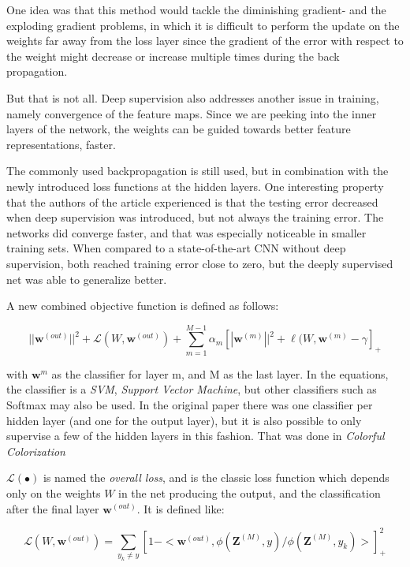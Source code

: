 One idea was that this method would tackle the diminishing gradient- and the exploding gradient problems, in which it is difficult to perform the update on the weights far away from the loss layer since the gradient of the error with respect to the weight might decrease or increase multiple times during the back propagation. 

But that is not all. Deep supervision also addresses another issue in training, namely convergence of the feature maps. Since we are peeking into the inner layers of the network, the weights can be guided towards better feature representations, faster. 

The commonly used backpropagation is still used, but in combination with the newly introduced loss functions at the hidden layers. One interesting property that the authors of the article experienced is that the testing error decreased when deep supervision was introduced, but not always the training error. The networks did converge faster, and that was especially noticeable in smaller training sets. When compared to a state-of-the-art CNN without deep supervision, both reached training error close to zero, but the deeply supervised net was able to generalize better. 

A new combined objective function is defined as follows:

\begin{equation}
||\textbf{w}^{(out)}||^2 + \mathcal{L}(W, \textbf{w}^{(out)}) + \sum\limits_{m = 1}^{M - 1}\alpha_m[|\textbf{w}^{(m)}||^2 + \ell(W, \textbf{w}^{(m)} - \gamma]_+
\end{equation}

with $\textbf{w}^{m}$ as the classifier for layer m, and M as the last layer. In the equations, the classifier is a \emph{SVM}, \emph{Support Vector Machine}, but other classifiers such as Softmax may also be used. In the original paper there was one classifier per hidden layer (and one for the output layer), but it is also possible to only supervise a few of the hidden layers in this fashion. That was done in \emph{Colorful Colorization} %

$\mathcal{L}(\bullet)$ is named the \emph{overall loss}, and is the classic loss function which depends only on the weights $W$ in the net producing the output, and the classification after the final layer $\textbf{w}^{(out)}$. It is defined like:

\begin{equation}
\mathcal{L}(W, \textbf{w}^{(out)}) = \sum\limits_{y_k \neq y} [1 - < \textbf{w}^{(out)}, \phi(\textbf{Z}^{(M)}, y) / \phi(\textbf{Z}^{(M)}, y_k) >]^{2}_+
\end{equation}

